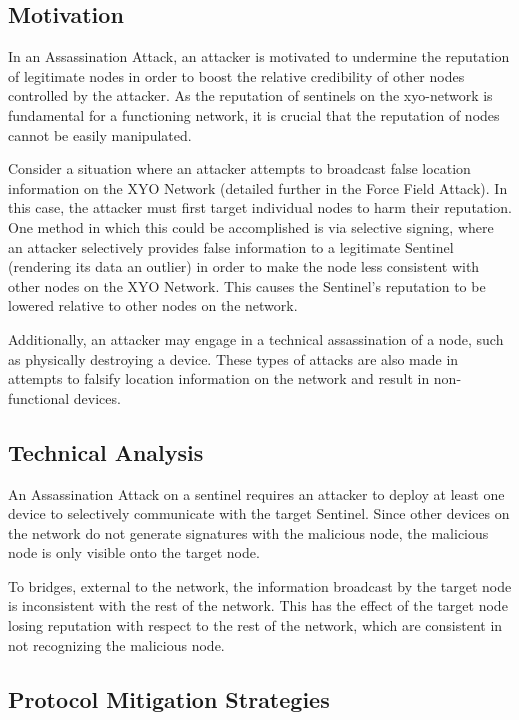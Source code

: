 \documentclass{article}
\begin{document}
\subsection{Motivation}

In an Assassination Attack, an attacker is motivated to undermine the reputation of legitimate nodes in order to boost the relative credibility of other nodes controlled by the attacker. As the reputation of \Glspl{sentinel} on the \Gls{xyo-network} is fundamental for a functioning network, it is crucial that the reputation of nodes cannot be easily manipulated.

Consider a situation where an attacker attempts to broadcast false location information on the XYO Network (detailed further in the Force Field Attack). In this case, the attacker must first target individual nodes to harm their reputation. One method in which this could be accomplished is via selective signing, where an attacker selectively provides false information to a legitimate Sentinel (rendering its data an outlier) in order to make the node less consistent with other nodes on the XYO Network. This causes the Sentinel's reputation to be lowered relative to other nodes on the network.

Additionally, an attacker may engage in a technical assassination of a node, such as physically destroying a device. These types of attacks are also made in attempts to falsify location information on the network and result in non-functional devices.

\subsection{Technical Analysis}

An Assassination Attack on a \Gls{sentinel} requires an attacker to deploy at least one device to selectively communicate with the target Sentinel. Since other devices on the network do not generate signatures with the malicious node, the malicious node is only visible onto the target node.

To \gls{bridge}s, external to the network, the information broadcast by the target node is inconsistent with the rest of the network. This has the effect of the target node losing reputation with respect to the rest of the network, which are consistent in not recognizing the malicious node.

\subsection{Protocol Mitigation Strategies}
\end{document}
